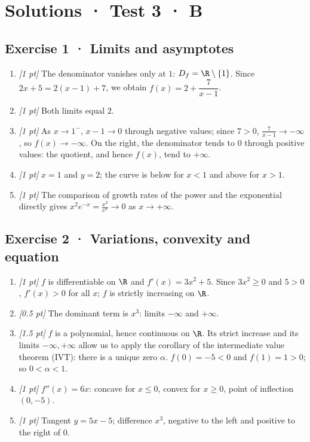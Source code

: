 \ifprof\clearpage

\section*{Solutions · Test 3 · B}\label{cor:4-4}

\subsection*{Exercise 1 · Limits and asymptotes}\begin{enumerate}

\item \textit{[1 pt]} The denominator vanishes only at $1$: $D_f=\R\setminus\{1\}$. Since $2x+5=2(x-1)+7$, we obtain $f(x)=2+\dfrac{7}{x-1}$.

\item \textit{[1 pt]} Both limits equal $2$.

\item \textit{[1 pt]} As $x\to 1^-$, $x-1\to0$ through negative values; since $7>0$, $\frac{7}{x-1}\to-\infty$, so $f(x)\to-\infty$. On the right, the denominator tends to $0$ through positive values: the quotient, and hence $f(x)$, tend to $+\infty$.

\item \textit{[1 pt]} $x=1$ and $y=2$; the curve is below for $x<1$ and above for $x>1$.

\item \textit{[1 pt]} The comparison of growth rates of the power and the exponential directly gives $x^2e^{-x}=\frac{x^2}{e^x}\to0$ as $x\to+\infty$.

\end{enumerate}

\subsection*{Exercise 2 · Variations, convexity and equation}\begin{enumerate}

\item \textit{[1 pt]} $f$ is differentiable on $\R$ and $f'(x)=3x^2+5$. Since $3x^2\ge0$ and $5>0$, $f'(x)>0$ for all $x$; $f$ is strictly increasing on $\R$.

\item \textit{[0.5 pt]} The dominant term is $x^3$: limits $-\infty$ and $+\infty$.

\item \textit{[1.5 pt]} $f$ is a polynomial, hence continuous on $\R$. Its strict increase and its limits $-\infty,+\infty$ allow us to apply the corollary of the intermediate value theorem (IVT): there is a unique zero $\alpha$. $f(0)=-5<0$ and $f(1)=1>0$; so $0<\alpha<1$.

\item \textit{[1 pt]} $f''(x)=6x$: concave for $x\le0$, convex for $x\ge0$, point of inflection $(0,-5)$.

\item \textit{[1 pt]} Tangent $y=5x-5$; difference $x^3$, negative to the left and positive to the right of $0$.

\end{enumerate}

